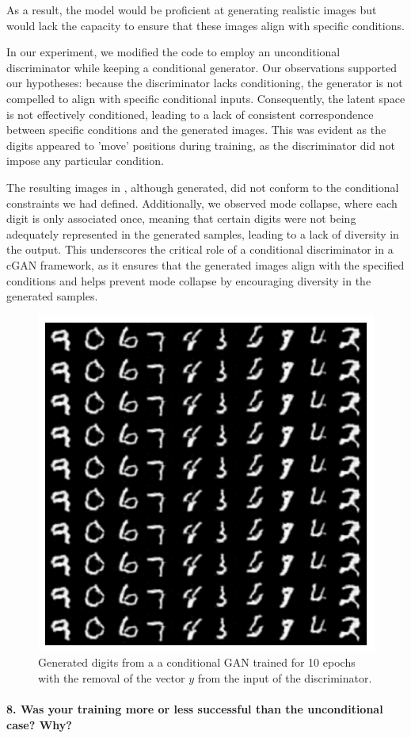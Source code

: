As a result, the model would be proficient at generating realistic images but would lack the capacity to ensure that these images align with specific conditions.

In our experiment, we modified the code to employ an unconditional discriminator while keeping a conditional generator. Our observations supported our hypotheses: because the discriminator lacks conditioning, the generator is not compelled to align with specific conditional inputs. Consequently, the latent space is not effectively conditioned, leading to a lack of consistent correspondence between specific conditions and the generated images. This was evident as the digits appeared to 'move' positions during training, as the discriminator did not impose any particular condition. 

The resulting images in , although generated, did not conform to the conditional constraints we had defined.  Additionally, we observed mode collapse, where each digit is only associated once, meaning that certain digits were not being adequately represented in the generated samples, leading to a lack of diversity in the output. This underscores the critical role of a conditional discriminator in a cGAN framework, as it ensures that the generated images align with the specified conditions and helps prevent mode collapse by encouraging diversity in the generated samples.

\begin{figure}[H]
    \centering
    \includegraphics[width=.5\textwidth]{cgan_mnist}
    \caption{Generated digits from a a conditional GAN trained for 10 epochs with the removal of the vector $y$ from the input of the discriminator.}
    \label{fig:cgan_mnist}
\end{figure}

\paragraph*{8. Was your training more or less successful than the unconditional case? Why?}

